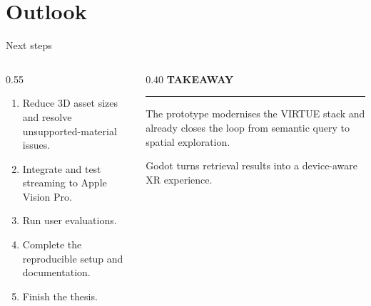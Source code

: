 \section{Outlook}
\begin{frame}[c]{Next steps}
\begin{columns}[T,onlytextwidth]
  \begin{column}{0.55\textwidth}
    \small
    \begin{enumerate}
      \item Reduce 3D asset sizes and resolve unsupported-material issues.
      \item Integrate and test streaming to Apple Vision Pro.
      \item Run user evaluations.
      \item Complete the reproducible setup and documentation.
      \item Finish the thesis.
    \end{enumerate}
  \end{column}
  \begin{column}{0.40\textwidth}
    \textcolor{unired}{\large\textbf{TAKEAWAY}}

    \vspace{0.12cm}
    \color{unimint}\rule{\linewidth}{1.6pt}

    \vspace{0.22cm}
    \small
    The prototype modernises the VIRTUE stack and already closes the loop from semantic query to spatial exploration.

    \vspace{0.35cm}
    Godot turns retrieval results into a device-aware XR experience.
  \end{column}
\end{columns}

\end{frame}
